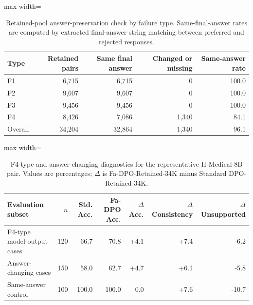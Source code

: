 \documentclass[a4paper,fleqn,doubleblind]{cas-sc}
\begin{document}
\begin{table}[htbp]
    \centering
    \footnotesize
    \caption{Retained-pool answer-preservation check by failure type. Same-final-answer rates are computed by extracted final-answer string matching between preferred and rejected responses.}
    \label{tab:answer_preservation_check}
    \begin{adjustbox}{max width=\columnwidth}
    \begin{tabular}{lrrrr}
        \toprule
        \textbf{Type} & \textbf{Retained pairs} & \textbf{Same final answer} & \textbf{Changed or missing} & \textbf{Same-answer rate} \\
        \midrule
        F1 & 6,715 & 6,715 & 0 & 100.0 \\
        F2 & 9,607 & 9,607 & 0 & 100.0 \\
        F3 & 9,456 & 9,456 & 0 & 100.0 \\
        F4 & 8,426 & 7,086 & 1,340 & 84.1 \\
        \midrule
        Overall & 34,204 & 32,864 & 1,340 & 96.1 \\
        \bottomrule
    \end{tabular}
    \end{adjustbox}
\end{table}

\begin{table}[htbp]
    \centering
    \footnotesize
    \caption{F4-type and answer-changing diagnostics for the representative II-Medical-8B pair. Values are percentages; $\Delta$ is Fa-DPO-Retained-34K minus Standard DPO-Retained-34K.}
    \label{tab:answer_changing_diagnostic}
    \begin{adjustbox}{max width=\textwidth}
    \begin{tabular}{lrrrrrr}
        \toprule
        \textbf{Evaluation subset} & \textbf{$n$} & \textbf{Std. Acc.} & \textbf{Fa-DPO Acc.} & \textbf{$\Delta$ Acc.} & \textbf{$\Delta$ Consistency} & \textbf{$\Delta$ Unsupported} \\
        \midrule
        F4-type model-output cases & 120 & 66.7 & 70.8 & +4.1 & +7.4 & -6.2 \\
        Answer-changing cases & 150 & 58.0 & 62.7 & +4.7 & +6.1 & -5.8 \\
        Same-answer control & 100 & 100.0 & 100.0 & 0.0 & +7.6 & -10.7 \\
        \bottomrule
    \end{tabular}
    \end{adjustbox}
\end{table}
\end{document}
